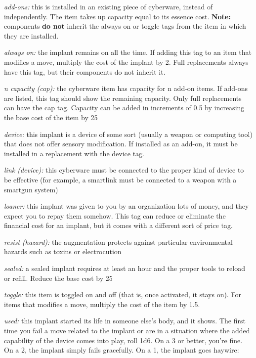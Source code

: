 \documentclass[oneside,10pt]{article}
\begin{document}
\begin{multicols}{2}
\begin{adjustwidth*}{.5cm}{.5cm}
\textit{add-ons:} this is installed in an existing piece of cyberware,
instead of independently. The item takes up capacity equal
to its essence cost. \textbf{Note:} components \textbf{do not} inherit the
always on or toggle tags from the item in which they are
installed.

\textit{always on:} the implant remains on all the time. If adding
this tag to an item that modifies a move, multiply the cost
of the implant by 2. Full replacements always have this tag,
but their components do not inherit it.

\textit{n capacity (cap):} the cyberware item has capacity for n
add-on items. If add-ons are listed, this tag should show
the remaining capacity. Only full replacements can have
the cap tag. Capacity can be added in increments of 0.5 by
increasing the base cost of the item by 25%

\textit{device:} this implant is a device of some sort (usually a
weapon or computing tool) that does not offer sensory
modification. If installed as an add-on, it must be installed
in a replacement with the device tag.

\textit{link (device):} this cyberware must be connected to the
proper kind of device to be effective (for example, a smartlink must be connected to a weapon with a smartgun system)

\textit{loaner:} this implant was given to you by an organization
lots of money, and they expect you to repay them somehow. This tag can reduce or eliminate the financial cost for
an implant, but it comes with a different sort of price tag.

\textit{resist (hazard):} the augmentation protects against particular environmental hazards such as toxins or electrocution

\textit{sealed:} a sealed implant requires at least an hour and the
proper tools to reload or refill. Reduce the base cost by
25%

\textit{toggle:} this item is toggled on and off (that is, once activated, it stays on). For items that modifies a move, multiply
the cost of the item by 1.5.

\textit{used:} this implant started its life in someone else’s body,
and it shows. The first time you fail a move related to the
implant or are in a situation where the added capability
of the device comes into play, roll 1d6. On a 3 or better,
you’re fine. On a 2, the implant simply fails gracefully. On
a 1, the implant goes haywire:
\begin{adjustwidth*}{.5cm}{.5cm}


\end{adjustwidth*}
\end{adjustwidth*}
\end{multicols}
\end{document}
